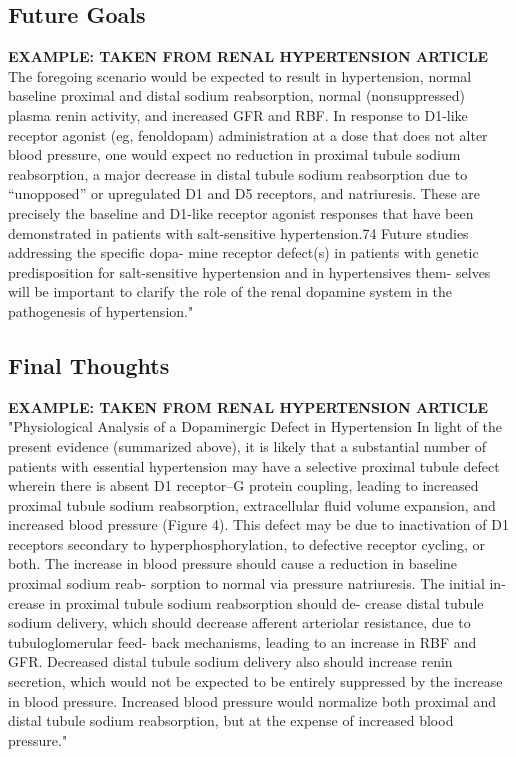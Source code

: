 \documentclass[smallextended]{svjour3}
\begin{document}
\subsection{Future Goals}
\textbf{EXAMPLE: TAKEN FROM RENAL HYPERTENSION ARTICLE}
The foregoing scenario would be expected to result in
hypertension, normal baseline proximal and distal sodium reabsorption, normal (nonsuppressed) plasma renin activity, and increased GFR and RBF. In response to D1-like receptor agonist (eg, fenoldopam) administration at a dose that does not alter blood pressure, one would expect no reduction in proximal tubule sodium reabsorption, a major decrease in distal tubule sodium reabsorption due to “unopposed” or upregulated D1 and D5 receptors, and natriuresis. These are precisely the baseline and D1-like receptor agonist responses that have been demonstrated in patients with salt-sensitive hypertension.74 Future studies addressing the specific dopa- mine receptor defect(s) in patients with genetic predisposition for salt-sensitive hypertension and in hypertensives them- selves will be important to clarify the role of the renal dopamine system in the pathogenesis of hypertension." \cite{Ref16}
\subsection{Final Thoughts}
\textbf{EXAMPLE: TAKEN FROM RENAL HYPERTENSION ARTICLE}
"Physiological Analysis of a Dopaminergic Defect in Hypertension
In light of the present evidence (summarized above), it is likely that a substantial number of patients with essential hypertension may have a selective proximal tubule defect wherein there is absent D1 receptor–G protein coupling, leading to increased proximal tubule sodium reabsorption, extracellular fluid volume expansion, and increased blood pressure (Figure 4). This defect may be due to inactivation of D1 receptors secondary to hyperphosphorylation, to defective receptor cycling, or both. The increase in blood pressure should cause a reduction in baseline proximal sodium reab- sorption to normal via pressure natriuresis. The initial in- crease in proximal tubule sodium reabsorption should de- crease distal tubule sodium delivery, which should decrease afferent arteriolar resistance, due to tubuloglomerular feed- back mechanisms, leading to an increase in RBF and GFR. Decreased distal tubule sodium delivery also should increase renin secretion, which would not be expected to be entirely suppressed by the increase in blood pressure. Increased blood pressure would normalize both proximal and distal tubule sodium reabsorption, but at the expense of increased blood pressure." \cite{Ref16}
\end{document}

